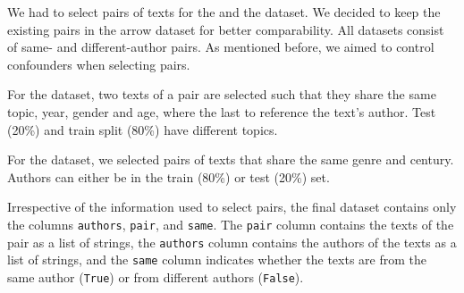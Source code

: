 We had to select pairs of texts for the \dataBlog{} and the \dataGutenberg{} dataset.
We decided to keep the existing pairs in the \dataPan{} arrow dataset for better comparability.
All datasets consist of same- and different-author pairs. 
As mentioned before, we aimed to control confounders when selecting pairs.

For the \dataBlog{} dataset, 
two texts of a pair are selected such that they share the same topic, year, gender and age, where the last to reference the text's author.
Test (20\%) and train split (80\%) have different topics.

For the \dataGutenberg{} dataset,
we selected pairs of texts that share the same genre and century.
Authors can either be in the train (80\%) or test (20\%) set.

Irrespective of the information used to select pairs, the final dataset contains only the columns \texttt{authors}, \texttt{pair}, and \texttt{same}.
The \texttt{pair} column contains the texts of the pair as a list of strings,
the \texttt{authors} column contains the authors of the texts as a list of strings,
and the \texttt{same} column indicates whether the texts are from the same author (\texttt{True}) or from different authors (\texttt{False}).
